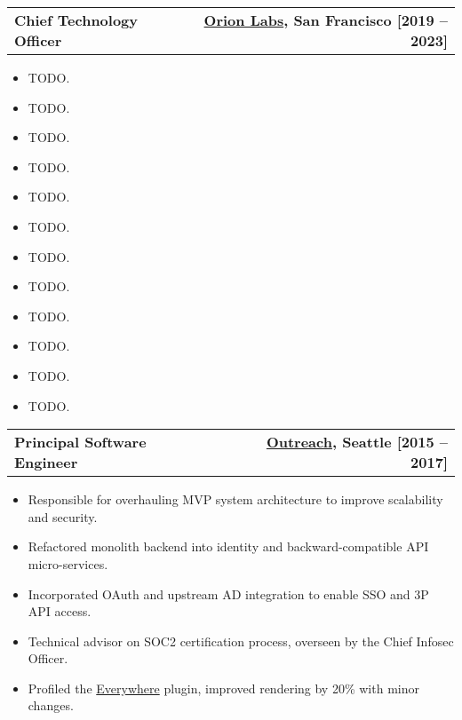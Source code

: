 \documentclass[12pt]{article}
\makeatletter
\newenvironment{justifycolumns}
{\begin{tabular*}{\textwidth}{@{\extracolsep{\fill}} lr@{}}}
{\end{tabular*}}
\newcommand{\row}[2]{#1 & #2 \\}
\newcommand{\rowheading}[2]{\row{\textbf{#1}}{\textbf{#2}}}
\newcommand{\range}[2]{#1 -- #2}
\newcommand{\blockseparation}{\vspace{0.13in}}
\newenvironment{tightbullets}
{\begin{itemize}}
{\end{itemize}}
\newenvironment{bullets}
{\begin{tightbullets}}
{\end{tightbullets} \blockseparation}
\makeatother
\begin{document}
\begin{flushleft}
\hspace{0.2in}
\begin{justifycolumns}
	\hspace{0.1in}
	\rowheading{Chief Technology Officer}{\textnormal{\href{https://orionlabs.io}{Orion Labs}, San Francisco [\range{2019}{2023}]}}
\end{justifycolumns}
\begin{bullets}
	\item TODO.
	\item TODO.
	\item TODO.
	\item TODO.
	\item TODO.
	\item TODO.
	\item TODO.
	\item TODO.
	\item TODO.
	\item TODO.
	\item TODO.
	\item TODO.
\end{bullets}
\vspace{0.05in}

\begin{justifycolumns}
	\hspace{0.1in}
	\rowheading{Principal Software Engineer}{\textnormal{\href{https://outreach.io}{Outreach}, Seattle [\range{2015}{2017}]}}
\end{justifycolumns}
\begin{bullets}
	\item Responsible for overhauling MVP system architecture to improve scalability and security.
	\item Refactored monolith backend into identity and backward-compatible API micro-services.
	\item Incorporated OAuth and upstream AD integration to enable SSO and 3P API access.
	\item Technical advisor on SOC2 certification process, overseen by the Chief Infosec Officer.
	\item Profiled the \href{https://chrome.google.com/webstore/detail/outreach-everywhere/chmpifjjfpeodjljjadlobceoiflhdid}{Everywhere} plugin, improved rendering by 20\% with minor changes.
\end{bullets}
\vspace{0.05in}


\end{flushleft}
\end{document}
